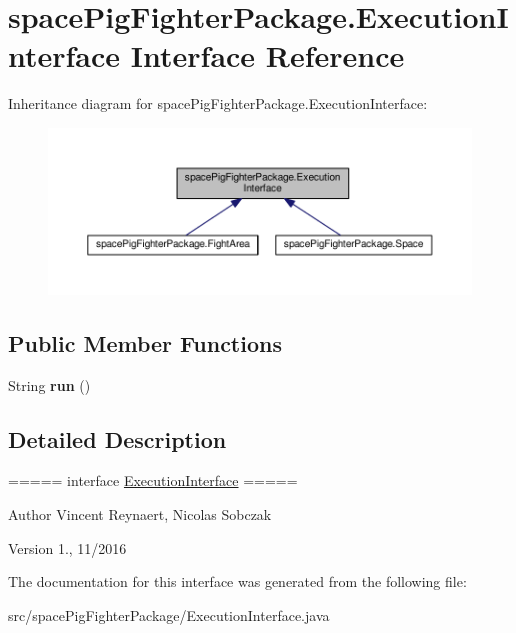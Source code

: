\hypertarget{interfacespace_pig_fighter_package_1_1_execution_interface}{}\section{space\+Pig\+Fighter\+Package.\+Execution\+Interface Interface Reference}
\label{interfacespace_pig_fighter_package_1_1_execution_interface}


Inheritance diagram for space\+Pig\+Fighter\+Package.\+Execution\+Interface\+:\nopagebreak
\begin{figure}[H]
\begin{center}
\leavevmode
\includegraphics[width=350pt]{interfacespace_pig_fighter_package_1_1_execution_interface__inherit__graph}
\end{center}
\end{figure}
\subsection*{Public Member Functions}
\begin{DoxyCompactItemize}
\item 
String {\bfseries run} ()\hypertarget{interfacespace_pig_fighter_package_1_1_execution_interface_abd2b9509aa108fbd0f82b81b5abcd100}{}\label{interfacespace_pig_fighter_package_1_1_execution_interface_abd2b9509aa108fbd0f82b81b5abcd100}

\end{DoxyCompactItemize}


\subsection{Detailed Description}
===== interface \hyperlink{interfacespace_pig_fighter_package_1_1_execution_interface}{Execution\+Interface} =====

\begin{DoxyAuthor}{Author}
Vincent Reynaert, Nicolas Sobczak 
\end{DoxyAuthor}
\begin{DoxyVersion}{Version}
1., 11/2016 
\end{DoxyVersion}


The documentation for this interface was generated from the following file\+:\begin{DoxyCompactItemize}
\item 
src/space\+Pig\+Fighter\+Package/Execution\+Interface.\+java\end{DoxyCompactItemize}

